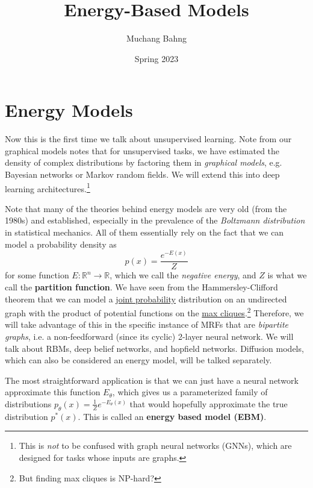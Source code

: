 \documentclass{article}
\begin{document}

\title{Energy-Based Models}
\author{Muchang Bahng}
\date{Spring 2023}

\maketitle
\tableofcontents
\pagebreak 




\section{Energy Models} 

  Now this is the first time we talk about unsupervised learning. Note from our graphical models notes that for unsupervised tasks, we have estimated the density of complex distributions by factoring them in \textit{graphical models}, e.g. Bayesian networks or Markov random fields. We will extend this into deep learning architectures.\footnote{This is \textit{not} to be confused with graph neural networks (GNNs), which are designed for tasks whose inputs are graphs.} 

  Note that many of the theories behind energy models are very old (from the 1980s) and established, especially in the prevalence of the \textit{Boltzmann distribution} in statistical mechanics. All of them essentially rely on the fact that we can model a probability density as 
  \begin{equation}
    p(x) = \frac{e^{-E(x)}}{Z}
  \end{equation}
  for some function $E: \mathbb{R}^n \rightarrow \mathbb{R}$, which we call the \textit{negative energy}, and $Z$ is what we call the \textbf{partition function}. We have seen from the Hammersley-Clifford theorem that we can model a \hyperref[prob-def:joint-probability-law]{joint probability} distribution on an undirected graph with the product of potential functions on the \hyperref[dsa-max-clique-np-hard]{max cliques}.\footnote{But finding max cliques is NP-hard?} Therefore, we will take advantage of this in the specific instance of MRFs that are \textit{bipartite graphs}, i.e. a non-feedforward (since its cyclic) 2-layer neural network. We will talk about RBMs, deep belief networks, and hopfield networks. Diffusion models, which can also be considered an energy model, will be talked separately. 

  The most straightforward application is that we can just have a neural network approximate this function $E_\theta$, which gives us a parameterized family of distributions $p_\theta (x) = \frac{1}{Z} e^{-E_\theta (x)}$ that would hopefully approximate the true distribution $p^\ast (x)$. This is called an \textbf{energy based model (EBM)}. 
\end{document}
